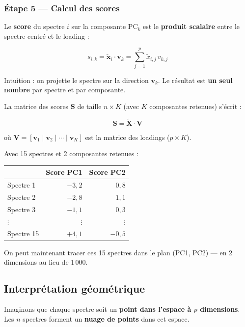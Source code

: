 \documentclass[12pt, a4paper]{article}
\newcommand{\Xc}{\tilde{\mathbf{X}}}
\newcommand{\vv}{\mathbf{v}}
\begin{document}
\subsubsection{Étape 5 --- Calcul des scores}

Le \textbf{score} du spectre $i$ sur la composante PC$_k$ est le
\textbf{produit scalaire} entre le spectre centré et le loading :

\[
s_{i,k} = \tilde{\mathbf{x}}_i \cdot \vv_k
         = \sum_{j=1}^{p} \tilde{x}_{i,j}\, v_{k,j}
\]

Intuition : on \og projette\fg{} le spectre sur la direction $\vv_k$.
Le résultat est \textbf{un seul nombre} par spectre et par composante.

\medskip

La matrice des scores $\mathbf{S}$ de taille $n \times K$ (avec $K$
composantes retenues) s'écrit :

\[
\mathbf{S} = \Xc \cdot \mathbf{V}
\]

où $\mathbf{V} = [\vv_1 \mid \vv_2 \mid \cdots \mid \vv_K]$ est la matrice
des loadings ($p \times K$).

\begin{exemple}
Avec 15 spectres et 2 composantes retenues :

\medskip
\begin{center}
\begin{tabular}{lrr}
\toprule
             & Score PC1 & Score PC2 \\
\midrule
Spectre 1    & $-3{,}2$  & $0{,}8$   \\
Spectre 2    & $-2{,}8$  & $1{,}1$   \\
Spectre 3    & $-1{,}1$  & $0{,}3$   \\
$\vdots$     & $\vdots$  & $\vdots$  \\
Spectre 15   & $+4{,}1$  & $-0{,}5$  \\
\bottomrule
\end{tabular}
\end{center}

\medskip
On peut maintenant tracer ces 15 spectres dans le plan (PC1, PC2) — en 2
dimensions au lieu de 1\,000.
\end{exemple}

\subsection{Interprétation géométrique}

Imaginons que chaque spectre soit un \textbf{point dans l'espace à $p$
dimensions}. Les $n$ spectres forment un \textbf{nuage de points} dans cet
espace.
\end{document}
